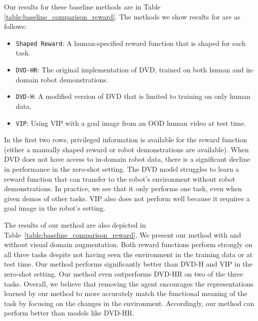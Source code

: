 Our results for these baseline methods are in Table \ref{table:baseline_comparison_reward}. The methods we show results for are as follows:

\begin{itemize}
    \item \verb|Shaped Reward|: A human-specified reward function that is shaped for each task.
    \item \verb|DVD-HR|: The original implementation of DVD, trained on both human and in-domain robot demonstrations.
    \item \verb|DVD-H|: A modified version of DVD that is limited to training on only human data.
    \item \verb|VIP|: Using VIP with a goal image from an OOD human video at test time.
\end{itemize}

In the first two rows, privileged information is available for the reward function (either a manually shaped reward or robot demonstrations are available). When DVD does not have access to in-domain robot data, there is a significant decline in performance in the zero-shot setting. The DVD model struggles to learn a reward function that can transfer to the robot's environment without robot demonstrations. In practice, we see that it only performs one task, even when given demos of other tasks. VIP also does not perform well because it requires a goal image in the robot's setting.

The results of our method are also depicted in Table~\ref{table:baseline_comparison_reward}. We present our method with and without visual domain augmentation. Both reward functions perform strongly on all three tasks despite not having seen the environment in the training data or at test time. Our method performs significantly better than DVD-H and VIP in the zero-shot setting. Our method even outperforms DVD-HR on two of the three tasks. Overall, we believe that removing the agent encourages the representations learned by our method to more accurately match the functional meaning of the task by focusing on the changes in the environment. Accordingly, our method can perform better than models like DVD-HR.

